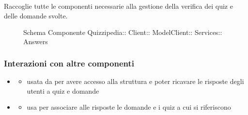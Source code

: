 \subsection{}
Raccoglie tutte le componenti necessarie alla gestione della verifica dei quiz e delle domande svolte.
\begin{figure}[H]
\centering
\noindent{}
\caption[Schema Componente Answers]{Schema Componente Quizzipedia:: Client:: ModelClient:: Services:: Answers}
\end{figure}
\subsubsection{Interazioni con altre componenti}
\begin{itemize}
\item {}
\begin{itemize}
\item usata da  per avere accesso alla struttura e poter ricavare le risposte degli utenti a quiz e domande
\end{itemize}
\item {}
\begin{itemize}
\item usa  per associare alle risposte le domande e i quiz a cui si riferiscono
\end{itemize}
\end{itemize}
